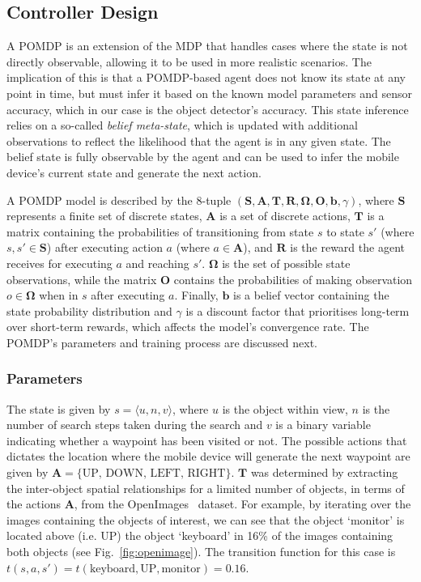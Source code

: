 \documentclass[runningheads]{llncs}
\begin{document}
\subsection{Controller Design}

A POMDP is an extension of the MDP that handles cases where the state is not directly observable, allowing it to be used in more realistic scenarios. 
The implication of this is that a POMDP-based agent does not know its state at any point in time, but must infer it based on the known model parameters and sensor accuracy, which in our case is the object detector's accuracy.
This state inference relies on a so-called {\em belief meta-state}, which is updated with additional observations to reflect the likelihood that the agent is in any given state.
The belief state is fully observable by the agent and can be used to infer the mobile device's current state and generate the next action.

A POMDP model is described by the 8-tuple $(\mathbf{S}, \mathbf{A}, \mathbf{T}, \mathbf{R}, \mathbf{\Omega}, \mathbf{O}, \mathbf{b}, \gamma)$, where $\mathbf{S}$ represents a finite set of discrete states, $\mathbf{A}$ is a set of discrete actions, $\mathbf{T}$ is a matrix containing the probabilities of transitioning from state $s$ to state $s'$ (where $s, s' \in \mathbf{S}$) after executing action $a$ (where $a \in \mathbf{A}$), and $\mathbf{R}$ is the reward the agent receives for executing $a$ and reaching $s'$.
$\mathbf{\Omega}$ is the set of possible state observations, while the matrix $\mathbf{O}$ contains the probabilities of making observation $o \in \mathbf{\Omega}$ when in $s$ after executing $a$.
Finally, $\mathbf{b}$ is a belief vector containing the state probability distribution and $\gamma$ is a discount factor that prioritises long-term over short-term rewards, which affects the model's convergence rate. 
The POMDP's parameters and training process are discussed next. 

\subsubsection{Parameters}

The state is given by $s = \langle u, n, v \rangle$, where $u$ is the object within view, $n$ is the number of search steps taken during the search and $v$ is a binary variable indicating whether a waypoint has been visited or not.
The possible actions that dictates the location where the mobile device will generate the next waypoint are given by $\mathbf{A} = \{ \textrm{UP, DOWN, LEFT, RIGHT} \}$.
$\mathbf{T}$ was determined by extracting the inter-object spatial relationships for a limited number of objects, in terms of the actions $\mathbf{A}$, from the OpenImages~\cite{openimages} dataset. 
For example, by iterating over the images containing the objects of interest, we can see that the object `monitor' is located above (i.e. UP) the object `keyboard' in 16\% of the images containing both objects (see Fig.~\ref{fig:openimage}). 
The transition function for this case is $t(s, a, s') = t(\textrm{keyboard}, \textrm{UP}, \textrm{monitor}) = 0.16$.
\end{document}
